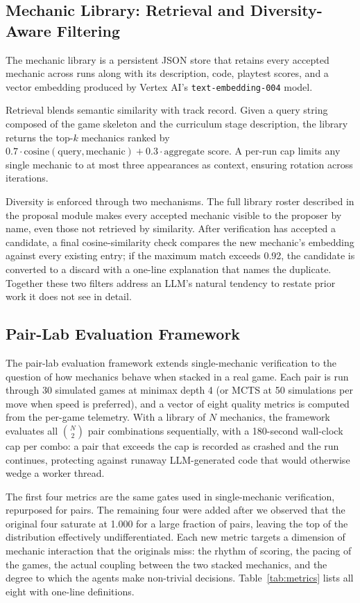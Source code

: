 \documentclass[conference]{IEEEtran}
\begin{document}
\subsection{Mechanic Library: Retrieval and Diversity-Aware Filtering}

The mechanic library is a persistent JSON store that retains every accepted mechanic across runs along with its description, code, playtest scores, and a vector embedding produced by Vertex AI's \texttt{text-embedding-004} model.

Retrieval blends semantic similarity with track record. Given a query string composed of the game skeleton and the curriculum stage description, the library returns the top-$k$ mechanics ranked by $0.7 \cdot \text{cosine}(\text{query}, \text{mechanic}) + 0.3 \cdot \text{aggregate score}$. A per-run cap limits any single mechanic to at most three appearances as context, ensuring rotation across iterations.

Diversity is enforced through two mechanisms. The full library roster described in the proposal module makes every accepted mechanic visible to the proposer by name, even those not retrieved by similarity. After verification has accepted a candidate, a final cosine-similarity check compares the new mechanic's embedding against every existing entry; if the maximum match exceeds 0.92, the candidate is converted to a discard with a one-line explanation that names the duplicate. Together these two filters address an LLM's natural tendency to restate prior work it does not see in detail.

\subsection{Pair-Lab Evaluation Framework}

The pair-lab evaluation framework extends single-mechanic verification to the question of how mechanics behave when stacked in a real game. Each pair is run through 30 simulated games at minimax depth 4 (or MCTS at 50 simulations per move when speed is preferred), and a vector of eight quality metrics is computed from the per-game telemetry. With a library of $N$ mechanics, the framework evaluates all $\binom{N}{2}$ pair combinations sequentially, with a 180-second wall-clock cap per combo: a pair that exceeds the cap is recorded as crashed and the run continues, protecting against runaway LLM-generated code that would otherwise wedge a worker thread.

The first four metrics are the same gates used in single-mechanic verification, repurposed for pairs. The remaining four were added after we observed that the original four saturate at 1.000 for a large fraction of pairs, leaving the top of the distribution effectively undifferentiated. Each new metric targets a dimension of mechanic interaction that the originals miss: the rhythm of scoring, the pacing of the games, the actual coupling between the two stacked mechanics, and the degree to which the agents make non-trivial decisions. Table~\ref{tab:metrics} lists all eight with one-line definitions.
\end{document}
